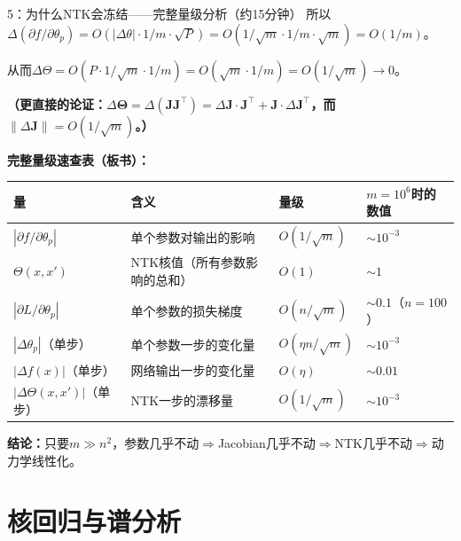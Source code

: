 \documentclass[11pt,a4paper]{article}
\newcommand{\bTheta}{\boldsymbol{\Theta}}
\newcommand{\bJ}{\mathbf{J}}
\begin{document}
\begin{handcalc}{5：为什么NTK会冻结——完整量级分析（约15分钟）}
所以$\Delta(\partial f/\partial\theta_p) = O(|\Delta\theta|\cdot 1/m\cdot\sqrt{P}) = O(1/\sqrt{m}\cdot 1/m\cdot\sqrt{m}) = O(1/m)$。

从而$\Delta\Theta = O(P\cdot 1/\sqrt{m}\cdot 1/m) = O(\sqrt{m}\cdot 1/m) = O(1/\sqrt{m}) \to 0$。

\textbf{（更直接的论证：$\Delta\bTheta = \Delta(\bJ\bJ^\top) = \Delta\bJ\cdot\bJ^\top+\bJ\cdot\Delta\bJ^\top$，而$\|\Delta\bJ\|=O(1/\sqrt{m})$。）}

\medskip
\textbf{完整量级速查表（板书）：}

\begin{center}
\renewcommand{\arraystretch}{1.3}
\begin{tabular}{llll}
\toprule
量 & 含义 & 量级 & $m=10^6$时的数值 \\
\midrule
$|\partial f/\partial\theta_p|$ & 单个参数对输出的影响 & $O(1/\sqrt{m})$ & $\sim 10^{-3}$ \\
$\Theta(x,x')$ & NTK核值（所有参数影响的总和） & $O(1)$ & $\sim 1$ \\
$|\partial L/\partial\theta_p|$ & 单个参数的损失梯度 & $O(n/\sqrt{m})$ & $\sim 0.1$（$n=100$）\\
$|\Delta\theta_p|$（单步） & 单个参数一步的变化量 & $O(\eta n/\sqrt{m})$ & $\sim 10^{-3}$ \\
$|\Delta f(x)|$（单步） & 网络输出一步的变化量 & $O(\eta)$ & $\sim 0.01$ \\
$|\Delta\Theta(x,x')|$（单步） & NTK一步的漂移量 & $O(1/\sqrt{m})$ & $\sim 10^{-3}$ \\
\bottomrule
\end{tabular}
\end{center}

\textbf{结论：}只要$m\gg n^2$，参数几乎不动$\Rightarrow$Jacobian几乎不动$\Rightarrow$NTK几乎不动$\Rightarrow$动力学线性化。
\end{handcalc}

\section{核回归与谱分析}
\end{document}
